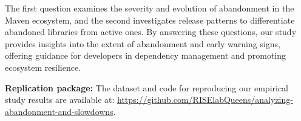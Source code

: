 The first question examines the severity and evolution of abandonment in the Maven ecosystem, and the second investigates release patterns to differentiate abandoned libraries from active ones. By answering these questions, our study provides insights into the extent of abandonment and early warning signs, offering guidance for developers in dependency management and promoting ecosystem resilience.



\noindent \textbf{Replication package:} The dataset and code for reproducing our empirical study results are available at: \url{https://github.com/RISElabQueens/analyzing-abandonment-and-slowdowns}.